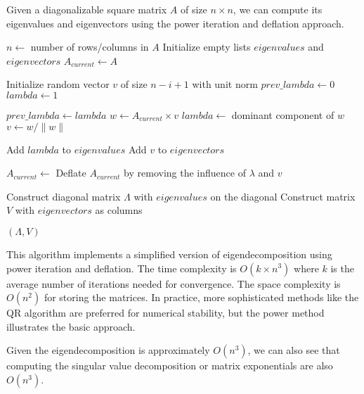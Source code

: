   \begin{algo}[Eigendecomposition]
    Given a diagonalizable square matrix $A$ of size $n \times n$, we can compute its eigenvalues and eigenvectors using the power iteration and deflation approach.
    \begin{algorithmic}[1]
       
        \State $n \gets$ number of rows/columns in $A$
        \State Initialize empty lists $eigenvalues$ and $eigenvectors$
        \State $A_{current} \gets A$ 
        
          \State Initialize random vector $v$ of size $n-i+1$ with unit norm
          \State $prev\_lambda \gets 0$
          \State $lambda \gets 1$
          
           
            \State $prev\_lambda \gets lambda$
            \State $w \gets A_{current} \times v$ 
            \State $lambda \gets$ dominant component of $w$
            \State $v \gets w / \|w\|$ 
          \EndWhile
          
          \State Add $lambda$ to $eigenvalues$
          \State Add $v$ to $eigenvectors$
          
          \State $A_{current} \gets$ Deflate $A_{current}$ by removing the influence of $\lambda$ and $v$
        \EndFor
        
        \State Construct diagonal matrix $\Lambda$ with $eigenvalues$ on the diagonal
        \State Construct matrix $V$ with $eigenvectors$ as columns
        
        \State \Return $(\Lambda, V)$ 
      \EndProcedure
    \end{algorithmic}
    This algorithm implements a simplified version of eigendecomposition using power iteration and deflation. The time complexity is $O(k \times n^3)$ where $k$ is the average number of iterations needed for convergence. The space complexity is $O(n^2)$ for storing the matrices. In practice, more sophisticated methods like the QR algorithm are preferred for numerical stability, but the power method illustrates the basic approach.
  \end{algo}

  Given the eigendecomposition is approximately $O(n^3)$, we can also see that computing the singular value decomposition or matrix exponentials are also $O(n^3)$. 
